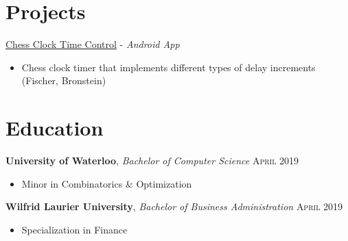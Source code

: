 \documentclass[a4paper,11pt]{article}
\begin{document}
\section{Projects}
\vspace{5pt}
\href{https://github.com/jaydonlau/Chess-Clock}{Chess Clock Time Control} - \emph {Android App} 
	\begin{itemize}[noitemsep, topsep=-1ex]
	\item Chess clock timer that implements different types of delay increments (Fischer, Bronstein)
	\end{itemize}

\section{Education}
\vspace{5pt}
 \textbf{University of Waterloo},  \emph{Bachelor of Computer Science} \hfill \textsc{April} 2019
 \begin{itemize}[noitemsep, topsep=-1ex]
 \item Minor in Combinatorics \& Optimization 
 \end{itemize} 
  \textbf{Wilfrid Laurier University}, \emph{Bachelor of Business Administration} \hfill \textsc{April} 2019
 \begin{itemize}[noitemsep, topsep=-1ex]
  \item Specialization in Finance
  \end{itemize} 
\end{document}
